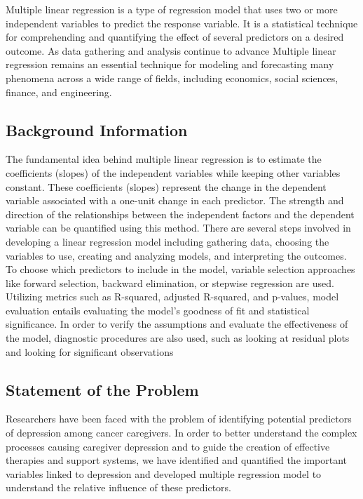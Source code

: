\documentclass[11pt]{article}\usepackage[]{graphicx}\usepackage[]{xcolor}
\numberwithin{equation}{section}
\numberwithin{table}{section}
\begin{document}
Multiple linear regression is a type of regression model that uses two or more independent variables to predict the response variable. It is a statistical technique for comprehending and quantifying the effect of several predictors on a desired outcome. As data gathering and analysis continue to advance Multiple linear regression remains an essential technique for modeling and forecasting many phenomena across a wide range of fields, including economics, social sciences, finance, and engineering.

\subsection{Background Information}
The fundamental idea behind multiple linear regression is to estimate the coefficients (slopes) of the independent variables while keeping other variables constant. These coefficients (slopes) represent the change in the dependent variable associated with a one-unit change in each predictor. The strength and direction of the relationships between the independent factors and the dependent variable can be quantified using this method. There are several steps involved in developing a linear regression model including gathering data, choosing the variables to use, creating and analyzing models, and interpreting the outcomes. To choose which predictors to include in the model, variable selection approaches like forward selection, backward elimination, or stepwise regression are used. Utilizing metrics such as R-squared, adjusted R-squared, and p-values, model evaluation entails evaluating the model's goodness of fit and statistical significance. In order to verify the assumptions and evaluate the effectiveness of the model, diagnostic procedures are also used, such as looking at residual plots and looking for significant observations

\subsection{Statement of the Problem}
Researchers have been faced with the problem of identifying potential predictors of depression among cancer caregivers.  In order to better understand the complex processes causing caregiver depression and to guide the creation of effective therapies and support systems, we have identified and quantified the important variables linked to depression and developed multiple regression model to understand the relative influence of these predictors.
\end{document}
